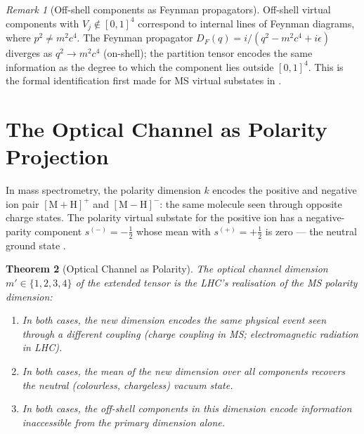 \documentclass[twocolumn,10pt,a4paper]{article}
\theoremstyle{thmstyle}
\newtheorem{theorem}{Theorem}[section]
\theoremstyle{definition}
\theoremstyle{remark}
\newtheorem{remark}[theorem]{Remark}
\begin{document}
\begin{remark}[Off-shell components as Feynman propagators]
Off-shell virtual components with $V_j \notin [0,1]^4$ correspond to
internal lines of Feynman diagrams, where $p^2 \neq m^2c^4$.
The Feynman propagator $D_F(q) = i/(q^2 - m^2c^4 + i\epsilon)$
diverges as $q^2 \to m^2c^4$ (on-shell); the partition tensor
encodes the same information as the degree to which the component lies
outside $[0,1]^4$.  This is the formal identification first made for
MS virtual substates in \citet{companion:tensor}.
\end{remark}

\section{The Optical Channel as Polarity Projection}
\label{sec:optical}

In mass spectrometry, the polarity dimension $k$ encodes the positive and
negative ion pair $[\mathrm{M+H}]^+$ and $[\mathrm{M-H}]^-$: the same
molecule seen through opposite charge states.  The polarity virtual substate
for the positive ion has a negative-parity component
$s^{(-)} = -\tfrac{1}{2}$ whose mean with $s^{(+)} = +\tfrac{1}{2}$
is zero — the neutral ground state \citep{companion:tensor}.

\begin{theorem}[Optical Channel as Polarity]
\label{thm:optical_polarity}
The optical channel dimension $m' \in \{1,2,3,4\}$ of the extended tensor
is the LHC's realisation of the MS polarity dimension:
\begin{enumerate}[nosep,label=(\roman*)]
\item In both cases, the new dimension encodes the same physical event seen
  through a different coupling (charge coupling in MS; electromagnetic
  radiation in LHC).
\item In both cases, the mean of the new dimension over all components
  recovers the neutral (colourless, chargeless) vacuum state.
\item In both cases, the off-shell components in this dimension encode
  information inaccessible from the primary dimension alone.
\end{enumerate}
\end{theorem}
\end{document}
